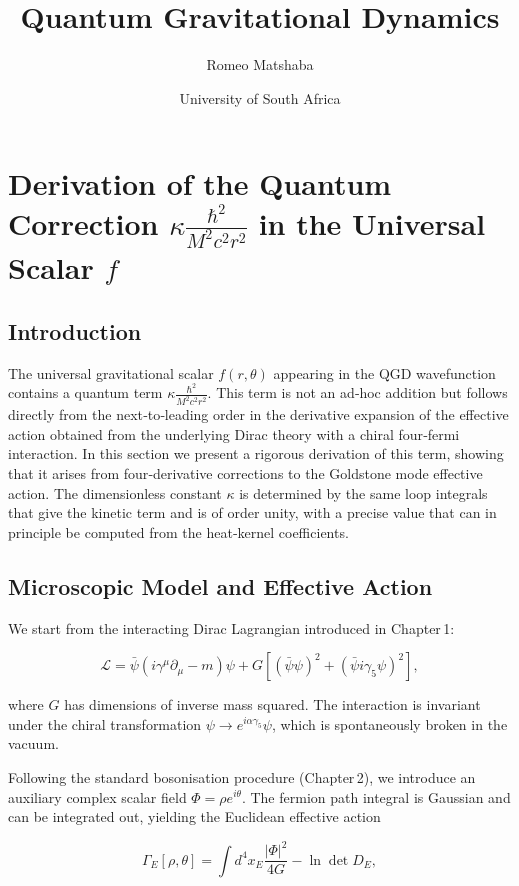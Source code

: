 \documentclass[11pt,a4paper]{article}
\title{Quantum Gravitational Dynamics}
\author{Romeo Matshaba}
\date{University of South Africa}
\begin{document}
\section{Derivation of the Quantum Correction \(\kappa \frac{\hbar^2}{M^2 c^2 r^2}\) in the Universal Scalar \(f\)}

\subsection{Introduction}

The universal gravitational scalar \(f(r,\theta)\) appearing in the QGD wavefunction contains a quantum term \(\kappa \frac{\hbar^2}{M^2 c^2 r^2}\). This term is not an ad‑hoc addition but follows directly from the next‑to‑leading order in the derivative expansion of the effective action obtained from the underlying Dirac theory with a chiral four‑fermi interaction. In this section we present a rigorous derivation of this term, showing that it arises from four‑derivative corrections to the Goldstone mode effective action. The dimensionless constant \(\kappa\) is determined by the same loop integrals that give the kinetic term and is of order unity, with a precise value that can in principle be computed from the heat‑kernel coefficients.

\subsection{Microscopic Model and Effective Action}

We start from the interacting Dirac Lagrangian introduced in Chapter 1:

\begin{equation}
\mathcal{L} = \bar\psi(i\gamma^\mu\partial_\mu - m)\psi + G\left[(\bar\psi\psi)^2 + (\bar\psi i\gamma_5\psi)^2\right],
\end{equation}

where \(G\) has dimensions of inverse mass squared. The interaction is invariant under the chiral transformation \(\psi \to e^{i\alpha\gamma_5}\psi\), which is spontaneously broken in the vacuum.

Following the standard bosonisation procedure (Chapter 2), we introduce an auxiliary complex scalar field \(\Phi = \rho e^{i\theta}\). The fermion path integral is Gaussian and can be integrated out, yielding the Euclidean effective action

\begin{equation}
\Gamma_E[\rho,\theta] = \int d^4x_E \frac{|\Phi|^2}{4G} - \ln\det D_E,
\end{equation}
\end{document}
